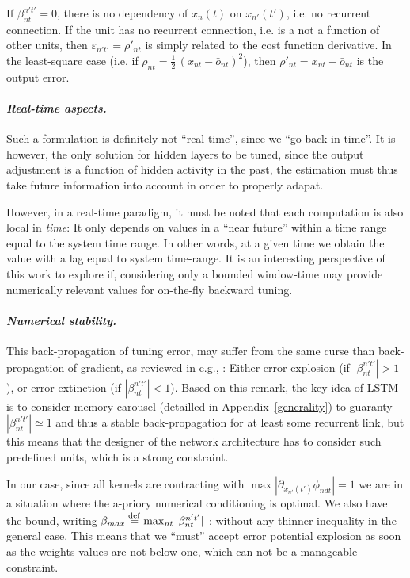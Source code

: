 If $\beta_{nt}^{n't'} = 0$, there is no dependency of ${x}_n(t)$ on ${x}_{n'}(t')$, i.e. no recurrent connection. If the unit has no recurrent connection, i.e. is a not a function of other units, then $\varepsilon_{n't'} = \rho'_{nt}$ is simply related to the cost function derivative. In the least-square case (i.e. if $\rho_{nt} = \frac{1}{2} \, (x_{nt} - \bar{o}_{nt})^2$), then $\rho'_{nt} = x_{nt} - \bar{o}_{nt}$ is the output error.

\paragraph{\em Real-time aspects.}

Such a formulation is definitely not ``real-time'', since we ``go back in time''. It is however, the only solution for hidden layers to be tuned, since the output adjustment is a function of hidden activity in the past, the estimation must thus take future information into account in order to properly adapat.

However, in a real-time paradigm, it must be noted that each computation is also local in {\em time}: It only depends on values in a ``near future'' within a time range equal to the system time range. In other words, at a given time we obtain the value with a lag equal to system time-range. It is an interesting perspective of this work to explore if, considering only a bounded window-time may provide numerically relevant values for on-the-fly backward tuning.

\paragraph{\em Numerical stability.}

This back-propagation of tuning error, may suffer from the same curse than back-propagation of gradient, as reviewed in e.g., \cite{Hochreiter:1997}: Either error explosion (if $|\beta_{nt}^{n't'}| > 1$), or error extinction (if $|\beta_{nt}^{n't'}| < 1$). Based on this remark, the key idea of LSTM \cite{Hochreiter:1997} is to consider memory carousel (detailled in Appendix~\ref{generality}) to guaranty $\left|\beta_{nt}^{n't'}\right| \simeq 1$ and thus a stable back-propagation for at least some recurrent link, but this means that the designer of the network architecture has to consider such predefined units, which is a strong constraint.

In our case, since all kernels are contracting with $\max|\partial_{x_{n'}(t')} \phi_{ndt}| = 1$ we are in a situation where the a-priory numerical conditioning is optimal. We also have the bound, writing $\beta_{max} \stackrel {\rm def}{=} \max_{nt} |\beta_{nt}^{n't'}|$ :
without any thinner inequality in the general case. This means that we ``must'' accept error potential explosion as soon as the weights values are not below one, which can not be a manageable constraint.

